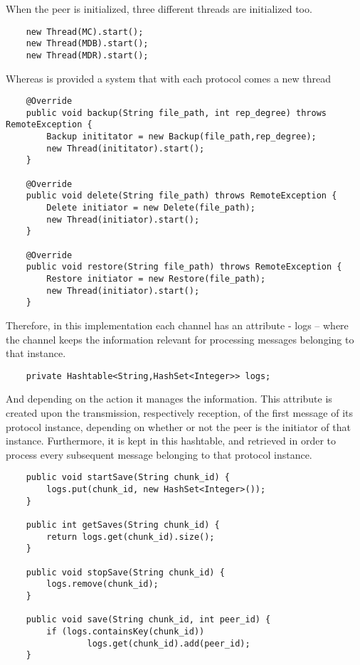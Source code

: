\documentclass[a4paper]{article}
\begin{document}
When the peer is initialized, three different threads are initialized too.


\vspace{5mm}
\lstset{title=""}
\begin{lstlisting}
    new Thread(MC).start();
    new Thread(MDB).start();
    new Thread(MDR).start();
\end{lstlisting}

Whereas is provided a system that with each protocol comes a new thread

\vspace{5mm}
\lstset{title=""}
\begin{lstlisting}
    @Override
    public void backup(String file_path, int rep_degree) throws RemoteException {
        Backup inititator = new Backup(file_path,rep_degree);
        new Thread(inititator).start();
    }

    @Override
    public void delete(String file_path) throws RemoteException {
        Delete initiator = new Delete(file_path);
        new Thread(initiator).start();
    }

    @Override
    public void restore(String file_path) throws RemoteException {
        Restore initiator = new Restore(file_path);
        new Thread(initiator).start();
    }
\end{lstlisting}

Therefore, in this implementation each channel has an attribute - logs – where the channel keeps the information relevant for processing messages belonging to that instance.

\vspace{5mm}
\lstset{title=""}
\begin{lstlisting}
	private Hashtable<String,HashSet<Integer>> logs;
\end{lstlisting}

And depending on the action it manages the information. This attribute is created upon the transmission, respectively reception, of the first message of its protocol instance, depending on whether or not the peer is the initiator of that instance.  Furthermore, it is kept in this hashtable, and retrieved in order to process every subsequent message belonging to that protocol instance.

\vspace{5mm}
\lstset{title=""}
\begin{lstlisting}
    public void startSave(String chunk_id) {
        logs.put(chunk_id, new HashSet<Integer>());
    }

	public int getSaves(String chunk_id) {
		return logs.get(chunk_id).size();
	}

	public void stopSave(String chunk_id) {
		logs.remove(chunk_id);
	}

	public void save(String chunk_id, int peer_id) {
		if (logs.containsKey(chunk_id))
				logs.get(chunk_id).add(peer_id);
	}
\end{lstlisting}
\end{document}
